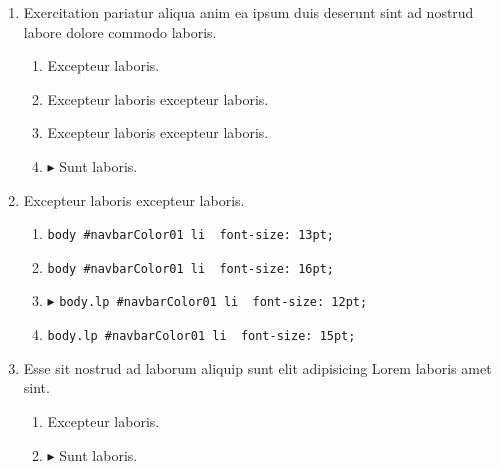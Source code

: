 \documentclass[a4paper,12pt]{article}
\begin{document}
\begin{enumerate}[label=\textbf{\arabic*.}]
\begin{multicols}{2}
\begin{enumerate}
		\item $\blacktriangleright$  Sunt laboris.
    
		\item  Excepteur laboris excepteur laboris.
    
	\end{enumerate}

\end{multicols}
\item Exercitation pariatur aliqua anim ea ipsum duis deserunt sint ad nostrud labore dolore commodo laboris.
\begin{multicols}{2}
	\begin{enumerate}
		\item  Excepteur laboris.
    
		\item  Excepteur laboris excepteur laboris.
    
		\item  Excepteur laboris excepteur laboris.
  
		\item $\blacktriangleright$  Sunt laboris.
    
	\end{enumerate}

\end{multicols}
\item Excepteur laboris excepteur laboris.
	\begin{enumerate}
		\item  \texttt{body \#navbarColor01 li { font-size: 13pt; }}
    
		\item  \texttt{body \#navbarColor01 li { font-size: 16pt; }}
  
		\item $\blacktriangleright$  \texttt{body.lp \#navbarColor01 li { font-size: 12pt; }}
    
		\item  \texttt{body.lp \#navbarColor01 li { font-size: 15pt; }}
    
	\end{enumerate}

\item Esse sit nostrud ad laborum aliquip sunt elit adipisicing Lorem laboris amet sint.
\begin{multicols}{2}
	\begin{enumerate}
		\item  Excepteur laboris.
    
		\item $\blacktriangleright$  Sunt laboris.
    

\end{enumerate}
\end{multicols}
\end{enumerate}
\end{document}

